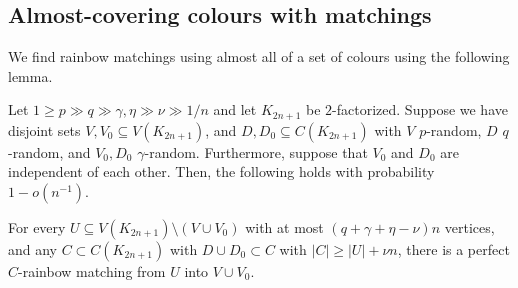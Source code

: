 \subsection{Almost-covering colours with matchings}
We find rainbow matchings using almost all of a set of colours using the following lemma.
\begin{lemma}\label{Lemma_saturating_matching_lemma}
Let $1\geq p\gg q\gg \gamma,\eta \gg \nu\gg 1/n$  and let  $K_{2n+1}$ be $2$-factorized.
Suppose we have disjoint sets $V, V_0\subseteq V(K_{2n+1})$, and $D,D_0\subseteq C(K_{2n+1})$  with $V$ $p$-random, $D$ $q$-random, and $V_0, D_0$ $\gamma$-random. Furthermore, suppose that $V_0$ and $D_0$ are independent of each other. Then, the following holds with  probability $1-o(n^{-1})$.

For every $U\subseteq V(K_{2n+1})\setminus (V\cup V_0)$ with at most $(q+\gamma+\eta-\nu)n$ vertices, and any $C\subset C(K_{2n+1})$ with $D\cup D_0\subset C$ with $|C|\geq |U|+\nu n$, there is a perfect $C$-rainbow matching from $U$ into $V\cup V_0$.
\end{lemma}
